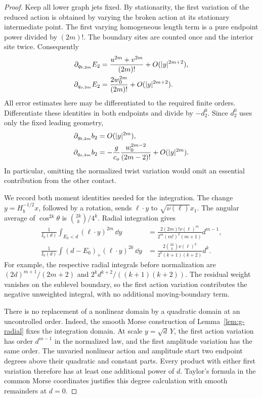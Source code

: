 \begin{proof}
Keep all lower graph jets fixed. By stationarity, the first variation
of the reduced action is obtained by varying the broken action at its
stationary intermediate point. The first varying homogeneous length
term is a pure endpoint power divided by $(2m)!$. The boundary sites
are counted once and the interior site twice. Consequently
\begin{align}
 \partial_{q_{b,2m}}E_2
   &=\frac{u^{2m}+v^{2m}}{(2m)!}+O(|y|^{2m+2}),\notag\\
 \partial_{q_{o,2m}}E_2
   &=\frac{2w_0^{2m}}{(2m)!}+O(|y|^{2m+2}).
                                      \label{eq:v13-action-variation}
\end{align}
All error estimates here may be differentiated to the required finite
orders. Differentiate these identities in both endpoints and divide
by $-d_2^0$. Since $d_2^0$ uses only the fixed leading geometry,
\begin{align}
 \partial_{q_{b,2m}}b_2&=O(|y|^{2m}),\notag\\
 \partial_{q_{o,2m}}b_2
   &=-\frac{g}{c_o}\frac{w_0^{2m-2}}{(2m-2)!}
                                           +O(|y|^{2m}).
                                      \label{eq:v13-twist-variation}
\end{align}
In particular, omitting the normalized twist variation would omit an
essential contribution from the other contact.

We record both moment identities needed for the integration. The
change $y=H_b^{-1/2}x$, followed by a rotation, sends $\ell\cdot y$
to $\sqrt{\nu(\ell)}x_1$. The angular average of
$\cos^{2k}\theta$ is $\binom{2k}{k}/4^k$. Radial integration gives
\begin{align}
 \frac1{I_0(d)}\int_{E_0<d}(\ell\cdot y)^{2m}\,\dd y
   &=\frac{2(2m)!\nu(\ell)^m}
            {2^m(m!)^2(m+1)}d^{m-1},\label{eq:v13-unweighted-moment}\\
 \frac1{I_0(d)}\int(d-E_0)_+(\ell\cdot y)^{2k}\,\dd y
   &=\frac{2\binom{2k}{k}\nu(\ell)^k}
            {2^k(k+1)(k+2)}d^k.\label{eq:v13-weighted-moment}
\end{align}
For example, the respective radial integrals before normalization are
$(2d)^{m+1}/(2m+2)$ and $2^kd^{k+2}/((k+1)(k+2))$.
The residual weight vanishes on the sublevel boundary, so the first
action variation contributes the negative unweighted integral, with
no additional moving-boundary term.

There is no replacement of a nonlinear domain by a quadratic domain
at an uncontrolled order. Indeed, the smooth Morse construction of
Lemma~\ref{lem:g-radial} fixes the integration domain. At scale
$y=\sqrt d\,Y$, the first action variation has order $d^{m-1}$
in the normalized law, and the first amplitude variation has the same
order. The unvaried nonlinear action and amplitude start two endpoint
degrees above their quadratic and constant parts. Every product with
either first variation therefore has at least one additional power
of $d$. Taylor's formula in the common Morse coordinates justifies
this degree calculation with smooth remainders at $d=0$.


\end{proof}
